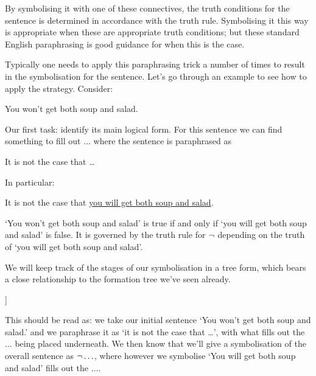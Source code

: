By symbolising it with one of these connectives, the truth conditions for the sentence is determined in accordance with the truth rule. 
Symbolising it this way is appropriate when these are appropriate truth conditions; but these standard English paraphrasing is good guidance for when this is the case. 

Typically one needs to apply this paraphrasing trick a number of times to result in the symbolisation for the sentence. 
Let's go through an example to see how to apply the strategy. Consider:
\begin{samplesent}
	\item\label{sent:negcon1} You won't get both soup and salad.
\end{samplesent}

Our first task: identify its main logical form. For this sentence we can find something to fill out $\ldots$ where the sentence is paraphrased as 
\begin{samplesent}
	\item[] It is not the case that \ldots
\end{samplesent}
In particular: 
\begin{samplesent}
	\item[] It is not the case that \underline{you will get both soup and salad}.
\end{samplesent}
`You won't get both soup and salad' is true if and only if `you will get both soup and salad' is false. It is governed by the truth rule for $\neg$ depending on the truth of `you will get both soup and salad'. 

We will keep track of the stages of our symbolisation in a tree form, which bears a close relationship to the formation tree we've seen already.
\begin{center}
	\begin{forest}
		[You won't get both soup and salad.\\It is not the case that \ldots\\$\enot\ldots$
		[You will get both soup and salad\\?]]
	\end{forest}
\end{center}
This should be read as: we take our initial sentence `You won't get both soup and salad.' and we paraphrase it as `it is not the case that \ldots', with what fills out the $\ldots$ being placed underneath. We then know that we'll give a symbolisation of the overall sentence as $\enot \ldots$, where however we symbolise `You will get both soup and salad' fills out the $\ldots$. 

